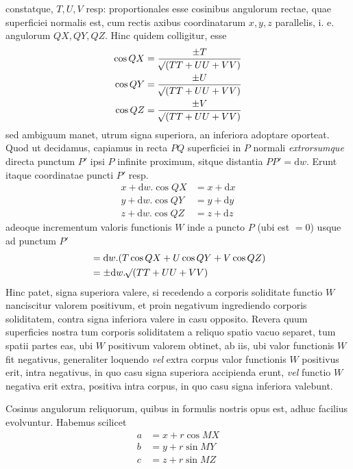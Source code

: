 constatque, $T,U,V$ resp: proportionales esse cosinibus angulorum rectae, quae superficiei normalis est, cum rectis axibus coordinatarum $x,y,z$ parallelis, i. e. angulorum $QX,QY,QZ$. Hinc quidem colligitur, esse
\[
\begin{aligned}
\cos QX&=\frac{\pm T}{\mathord{{}^{}\!\surd}(TT+UU+VV)}\\
\cos QY&=\frac{\pm U}{\mathord{{}^{}\!\surd}(TT+UU+VV)}\\
\cos QZ&=\frac{\pm V}{\mathord{{}^{}\!\surd}(TT+UU+VV)}
\end{aligned}
\]
sed ambiguum manet, utrum signa superiora, an inferiora adoptare oporteat. Quod ut decidamus, capiamus in recta $PQ$ superficiei in $P$ normali \textit{extrorsumque} directa punctum $P'$ ipsi $P$ infinite proximum, sitque distantia $PP'=\mathrm{d}w$. Erunt itaque coordinatae puncti $P'$ resp.
\[
\begin{aligned}
x+\mathrm{d}w.\cos QX&=x+\mathrm{d}x\\
y+\mathrm{d}w.\cos QY&=y+\mathrm{d}y\\
z+\mathrm{d}w.\cos QZ&=z+\mathrm{d}z
\end{aligned}
\]
adeoque incrementum valoris functionis $W$ inde a puncto $P$ (ubi est $=0$) usque ad punctum $P'$
\[
\begin{aligned}
&=\mathrm{d}w.(T\cos QX+U\cos QY+V\cos QZ)\\
&=\pm\mathrm{d}w.\mathord{{}^{}\!\surd}(TT+UU+VV)
\end{aligned}
\]
Hinc patet, signa superiora valere, si recedendo a corporis soliditate functio $W$ nanciscitur valorem positivum, et proin negativum ingrediendo corporis soliditatem, contra signa inferiora valere in casu opposito. Revera quum superficies nostra tum corporis soliditatem a reliquo spatio vacuo separet, tum spatii partes eas, ubi $W$ positivum valorem obtinet, ab iis, ubi valor functionis $W$ fit negativus, generaliter loquendo \textit{vel} extra corpus valor functionis $W$ positivus erit, intra negativus, in quo casu signa superiora accipienda erunt, \textit{vel} functio $W$ negativa erit extra, positiva intra corpus, in quo casu signa inferiora valebunt.

Cosinus angulorum reliquorum, quibus in formulis nostris opus est, adhuc facilius evolvuntur. Habemus scilicet
\[
\begin{aligned}
a&=x+r\cos MX\\
b&=y+r\sin MY\\
c&=z+r\sin MZ
\end{aligned}
\]
